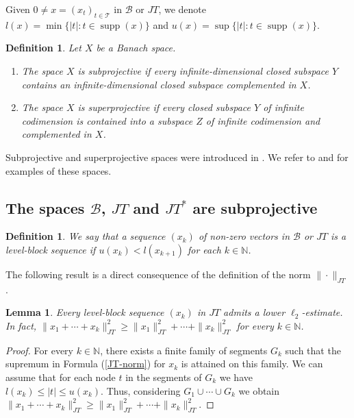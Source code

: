 \documentclass[12pt]{amsart}
\theoremstyle{plain}
\numberwithin{equation}{section}
\newcommand{\N}{\mathbb{N}}
\newcommand{\Tree}{\mathcal{T}}
\newcommand{\B}{\mathcal{B}}
\DeclareMathOperator{\supp}{supp}
\newtheorem{lemma}[theorem]{Lemma}
\newtheorem{definition}[theorem]{Definition}
\begin{document}
Given $0\neq x=(x_t)_{t\in \Tree}$ in $\B$ or $JT$, we denote $l(x)= \min\{|t| : t\in \supp(x)\}$ and  $u(x) = \sup\{|t| : t\in\supp(x) \}$.

\begin{definition} \label{definition1}
Let $X$ be a Banach space.
\begin{enumerate}
    \item The space $X$ is subprojective if every infinite-dimensional closed subspace $Y$ contains an infinite-dimensional closed subspace complemented in $X$.
    \item The space $X$ is superprojective if every closed subspace $Y$ of infinite codimension is contained into a subspace $Z$ of infinite codimension and complemented in $X$.
\end{enumerate}
\end{definition}

Subprojective and superprojective spaces were introduced in \cite{Whitley:64}. We refer to \cite{O-S:15} and \cite{G-P:16} for examples of these spaces.


\subsection{The spaces $\B$, $JT$ and $JT^*$ are subprojective}\label{sect:subp}

\begin{definition}
We say that a sequence $(x_k)$ of non-zero vectors in $\B$ or $JT$ is a \emph{level-block sequence} if $u(x_k)< l(x_{k+1})$ for each $k\in\N$.
\end{definition}

The following result is a direct consequence of the definition of the norm $\|\cdot\|_{JT}$.

\begin{lemma}\label{l-est}
Every level-block sequence $(x_k)$ in $JT$ admits a lower $\ell_2$-estimate. In fact, $\|x_1+\cdots+x_k\|^2_{JT}\geq \|x_1\|^2_{JT}+ \cdots+ \|x_k\|^2_{JT}$ for every $k\in\N$.
\end{lemma}
\begin{proof}
For every $k\in\N$, there exists a finite family of segments $G_k$ such that the supremum in Formula (\ref{JT-norm}) for $x_k$ is attained on this family. We can assume that for each node $t$ in the segments of $G_k$ we have $l(x_k)\leq |t|\leq u(x_k)$. Thus, considering $G_1\cup\cdots\cup G_k$ we obtain $\|x_1+\cdots+x_k\|^2_{JT}\geq \|x_1\|^2_{JT}+\cdots+ \|x_k\|^2_{JT}$.
\end{proof}
\end{document}
